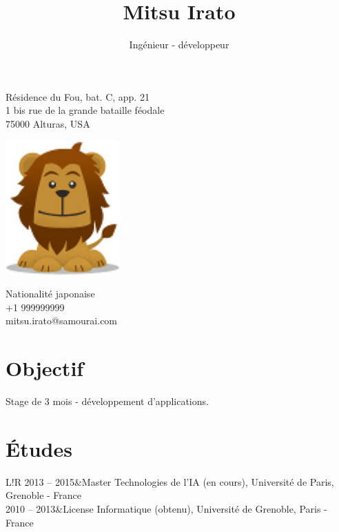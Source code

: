 \documentclass[10pt]{article}
\title{\bfseries\Huge Mitsu Irato}\author{Ingénieur - développeur}
\date{} %
\newcommand\VRule{\color{lightgray}\vrule width 0.5pt}
\begin{document}
\maketitle
\vspace{1em}
    \begin{minipage}[ht]{0.33\textwidth}
Résidence du Fou, bat. C, app. 21\\
1 bis rue de la grande bataille féodale\\
75000 Alturas, USA
\end{minipage}
\begin{minipage}[ht]{0.33\textwidth}
\begin{center}
      \includegraphics[width=0.33\textwidth,keepaspectratio]{lion.png}
      \end{center}
\end{minipage}
\begin{minipage}[ht]{0.33\textwidth}
\begin{flushright}
Nationalité japonaise\\
+1 999999999\\
mitsu.irato@samourai.com\end{flushright}

\end{minipage}
\vspace{20pt}

\section*{Objectif}
Stage de 3 mois - développement d'applications.

\section*{Études}
\begin{tabular}{L!{\VRule}R}
2013 -- 2015&Master Technologies de l'IA (en cours), Université de Paris, Grenoble - France\\
2010 -- 2013&License Informatique (obtenu), Université de Grenoble, Paris - France\\
\end{tabular}
\end{document}
